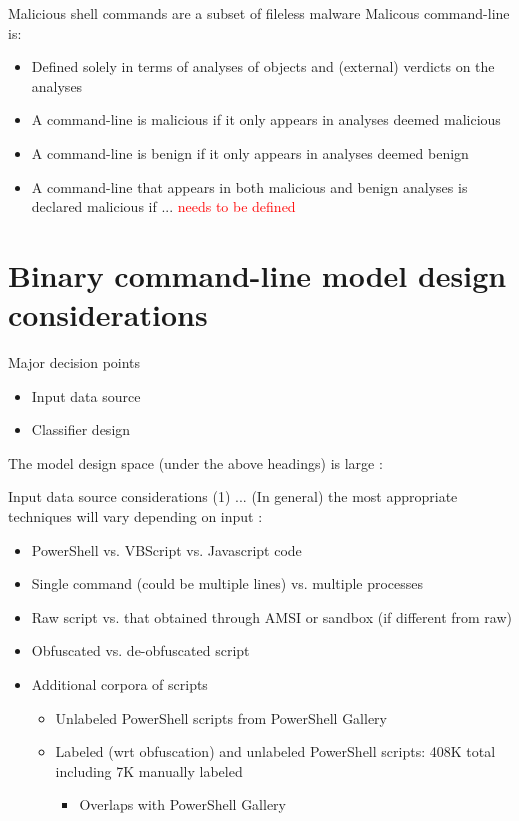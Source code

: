\documentclass[10pt]{beamer}
\begin{document}
\begin{frame}{Malicious shell commands are a subset of fileless malware}
	Malicous command-line is:
	\begin{itemize}
		\item Defined solely in terms of analyses of objects and (external) verdicts on the analyses
		\item A command-line is malicious if it only appears in analyses deemed malicious
		\item A command-line is benign if it only appears in analyses deemed benign
		\item A command-line that appears in both malicious and benign analyses is declared malicious if ... \textcolor{red}{needs to be defined}
	\end{itemize}
\end{frame}

\section{Binary command-line model design considerations}

\begin{frame}[fragile]{Major decision points}
	\begin{itemize}
		\item Input data source
		\item Classifier design
	\end{itemize}

	The model design space (under the above headings) is large \cite{survey2021,msft2017,powershell2018,amsi2019,feye2018,feye2018-2,charcnn2016,charcnn2019,transformers2019}:
\end{frame}

\begin{frame}{Input data source considerations (1) ...}
	(In general) the most appropriate techniques will vary depending on input \cite{msft2017-2,msft2019,feye2018}:
	\begin{itemize}
		\item PowerShell vs. VBScript vs. Javascript code 
		\item Single command (could be multiple lines) vs. multiple processes
		\item Raw script vs. that obtained through AMSI or sandbox (if different from raw)
		\item Obfuscated vs. de-obfuscated script
		\item Additional corpora of scripts
		\begin{itemize}
			\item Unlabeled PowerShell scripts from PowerShell Gallery \cite{data1}
			\item Labeled (wrt obfuscation) and unlabeled PowerShell scripts: 408K total including 7K manually labeled \cite{data21,data22}
			\begin {itemize}
				\item Overlaps with PowerShell Gallery
			\end {itemize}
		\end{itemize}
	\end{itemize}
\end{frame}
\end{document}
